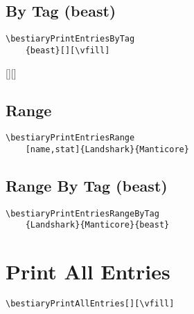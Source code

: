\documentclass[itdr]{subfiles}
\begin{document}
\vfill

\subsection{By Tag (beast)}

\begin{lstlisting}
\bestiaryPrintEntriesByTag
	{beast}[][\vfill]
\end{lstlisting}

[][\vfill]

\vfill

\subsection{Range}

\begin{lstlisting}
\bestiaryPrintEntriesRange
	[name,stat]{Landshark}{Manticore}
\end{lstlisting}


\vfill

\subsection{Range By Tag (beast)}

\begin{lstlisting}
\bestiaryPrintEntriesRangeByTag
	{Landshark}{Manticore}{beast}
\end{lstlisting}


\vfill
\break

\section{Print All Entries}

\begin{lstlisting}
\bestiaryPrintAllEntries[][\vfill]
\end{lstlisting}

\bestiaryPrintAllEntries[][\vfill]
\end{document}
